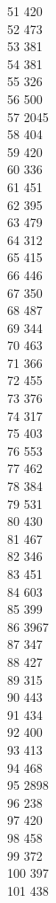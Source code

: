 { 51	420 \\
 52	473 \\
 53	381 \\
 54	381 \\
 55	326 \\
 56	500 \\
 57	2045 \\
 58	404 \\
 59	420 \\
 60	336 \\
 61	451 \\
 62	395 \\
 63	479 \\
 64	312 \\
 65	415 \\
 66	446 \\
 67	350 \\
 68	487 \\
 69	344 \\
 70	463 \\
 71	366 \\
 72	455 \\
 73	376 \\
 74	317 \\
 75	403 \\
 76	553 \\
 77	462 \\
 78	384 \\
 79	531 \\
 80	430 \\
 81	467 \\
 82	346 \\
 83	451 \\
 84	603 \\
 85	399 \\
 86	3967 \\
 87	347 \\
 88	427 \\
 89	315 \\
 90	443 \\
 91	434 \\
 92	400 \\
 93	413 \\
 94	468 \\
 95	2898 \\
 96	238 \\
 97	420 \\
 98	458 \\
 99	372 \\
 100	397 \\
 101	438 \\
}
